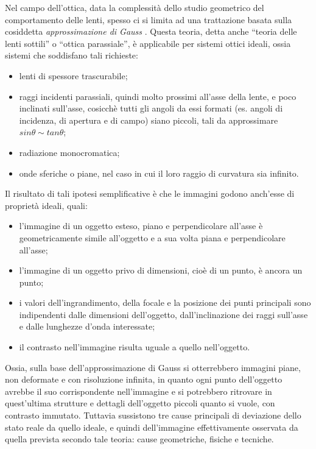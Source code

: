 Nel campo dell'ottica, data la complessità dello studio geometrico del comportamento delle lenti, spesso ci si limita ad una trattazione basata sulla cosiddetta \textit{approssimazione di Gauss} \cite{difetti}. 
Questa teoria, detta anche ``teoria delle lenti sottili'' o ``ottica parassiale'', è applicabile per sistemi ottici ideali, ossia sistemi che soddisfano tali richieste:

\begin{itemize}
\item lenti di spessore trascurabile;

\item raggi incidenti parassiali, quindi molto prossimi all'asse della lente, e poco inclinati sull'asse, cosicchè tutti gli angoli da essi formati (es. angoli di incidenza, di apertura e di campo) siano piccoli, tali da approssimare $sin\theta \sim tan\theta$;

\item radiazione monocromatica;

\item onde sferiche o piane, nel caso in cui il loro raggio di curvatura  sia infinito.
\end{itemize}

Il risultato di tali ipotesi semplificative è che le immagini godono anch'esse di proprietà ideali, quali:

\begin{itemize}
\item l'immagine di un oggetto esteso, piano e perpendicolare all'asse è geometricamente simile all'oggetto e a sua volta piana e perpendicolare all'asse;

\item l'immagine di un oggetto privo di dimensioni, cioè di un punto, è ancora un punto;

\item i valori dell'ingrandimento, della focale e la posizione dei punti principali sono indipendenti dalle dimensioni dell'oggetto, dall'inclinazione dei raggi sull'asse e dalle lunghezze d'onda interessate;

\item il contrasto nell'immagine risulta uguale a quello nell'oggetto.
\end{itemize}

Ossia, sulla base dell'approssimazione di Gauss si otterrebbero immagini piane, non deformate e con risoluzione infinita, in quanto ogni punto dell'oggetto avrebbe il suo corrispondente nell'immagine e si potrebbero ritrovare in quest'ultima strutture e dettagli dell'oggetto piccoli quanto si vuole, con contrasto immutato.
Tuttavia sussistono tre cause principali di deviazione dello stato reale da quello ideale, e quindi dell'immagine effettivamente osservata da quella prevista secondo tale teoria: cause geometriche, fisiche e tecniche.

